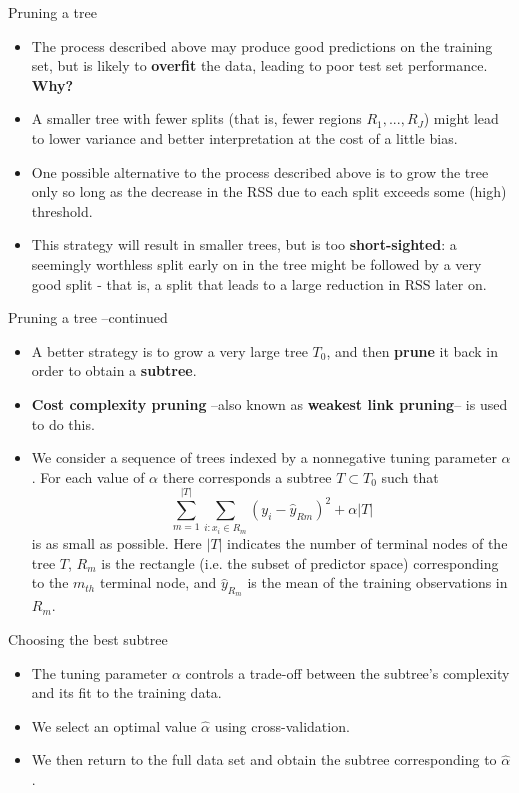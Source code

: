 \documentclass[aspectratio=169, 11pt]{beamer}
\begin{document}
\begin{frame}{Pruning a tree}
    \begin{itemize}
        \item The process described above may produce good predictions on the training set, but is likely to \textbf{overfit} the data, leading to poor test set performance. \textbf{Why?} \pause
        \item A smaller tree with fewer splits (that is, fewer regions $R_{1},...,R_{J}$) might lead to lower variance and better interpretation at the cost of a little bias.
        \item One possible alternative to the process described above is to grow the tree only so long as the decrease in the RSS due to each split exceeds some (high) threshold.
        \item This strategy will result in smaller trees, but is too \textbf{short-sighted}: a seemingly worthless split early on in the tree might be followed by a very good split - that is, a split that leads to a large reduction in RSS later on.
    \end{itemize}
\end{frame}

\begin{frame}{Pruning a tree --continued}
    \begin{itemize}
        \item A better strategy is to grow a very large tree $T_{0}$, and then \textbf{prune} it back in order to obtain a \textbf{subtree}.
        \item \textbf{Cost complexity pruning} --also known as \textbf{weakest link pruning}-- is used to do this.
        \item We consider a sequence of trees indexed by a nonnegative tuning parameter $\alpha$. For each value of $\alpha$ there corresponds a subtree $T \subset T_{0}$ such that
        \begin{equation*}
        \sum_{m=1}^{|T|}\sum_{i:x_{i}\in R_{m}}(y_{i}-\hat{y}_{Rm})^{2}+\alpha|T|
        \end{equation*}
        is as small as possible. Here $|T|$ indicates the number of terminal nodes of the tree $T$, $R_{m}$ is the rectangle (i.e. the subset of predictor space) corresponding to the $m_{th}$ terminal node, and $\hat{y}_{R_{m}}$ is the mean of the training observations in $R_{m}$.
    \end{itemize}
\end{frame}

\begin{frame}{Choosing the best subtree}
    \begin{itemize}
        \item The tuning parameter $\alpha$ controls a trade-off between the subtree's complexity and its fit to the training data.
        \item We select an optimal value $\hat{\alpha}$ using cross-validation.
        \item We then return to the full data set and obtain the subtree corresponding to $\hat{\alpha}$.
    \end{itemize}
\end{frame}
\end{document}
